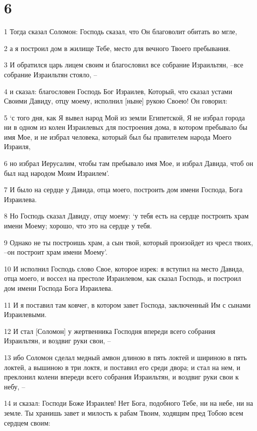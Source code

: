 \chapter{6}

\par 1 Тогда сказал Соломон: Господь сказал, что Он благоволит обитать во мгле,
\par 2 а я построил дом в жилище Тебе, место для вечного Твоего пребывания.
\par 3 И обратился царь лицем своим и благословил все собрание Израильтян, --все собрание Израильтян стояло, --
\par 4 и сказал: благословен Господь Бог Израилев, Который, что сказал устами Своими Давиду, отцу моему, исполнил [ныне] рукою Своею! Он говорил:
\par 5 `с того дня, как Я вывел народ Мой из земли Египетской, Я не избрал города ни в одном из колен Израилевых для построения дома, в котором пребывало бы имя Мое, и не избрал человека, который был бы правителем народа Моего Израиля,
\par 6 но избрал Иерусалим, чтобы там пребывало имя Мое, и избрал Давида, чтоб он был над народом Моим Израилем'.
\par 7 И было на сердце у Давида, отца моего, построить дом имени Господа, Бога Израилева.
\par 8 Но Господь сказал Давиду, отцу моему: `у тебя есть на сердце построить храм имени Моему; хорошо, что это на сердце у тебя.
\par 9 Однако не ты построишь храм, а сын твой, который произойдет из чресл твоих, --он построит храм имени Моему'.
\par 10 И исполнил Господь слово Свое, которое изрек: я вступил на место Давида, отца моего, и воссел на престоле Израилевом, как сказал Господь, и построил дом имени Господа Бога Израилева.
\par 11 И я поставил там ковчег, в котором завет Господа, заключенный Им с сынами Израилевыми.
\par 12 И стал [Соломон] у жертвенника Господня впереди всего собрания Израильтян, и воздвиг руки свои, --
\par 13 ибо Соломон сделал медный амвон длиною в пять локтей и шириною в пять локтей, а вышиною в три локтя, и поставил его среди двора; и стал на нем, и преклонил колени впереди всего собрания Израильтян, и воздвиг руки свои к небу, --
\par 14 и сказал: Господи Боже Израилев! Нет Бога, подобного Тебе, ни на небе, ни на земле. Ты хранишь завет и милость к рабам Твоим, ходящим пред Тобою всем сердцем своим:
